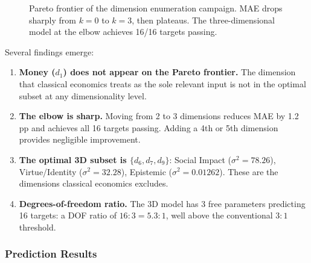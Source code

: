 \documentclass[manuscript,review,anonymous]{acmart}
\begin{document}
\begin{figure}[t]
\centering
{}
\caption{Pareto frontier of the dimension enumeration campaign. MAE drops sharply from $k=0$ to $k=3$, then plateaus. The three-dimensional model at the elbow achieves 16/16 targets passing.}
\label{fig:pareto}
\end{figure}

Several findings emerge:

\begin{enumerate}
    \item \textbf{Money ($d_1$) does not appear on the Pareto frontier.} The dimension that classical economics treats as the sole relevant input is not in the optimal subset at any dimensionality level.
    \item \textbf{The elbow is sharp.} Moving from 2 to 3 dimensions reduces MAE by 1.2 pp and achieves all 16 targets passing. Adding a 4th or 5th dimension provides negligible improvement.
    \item \textbf{The optimal 3D subset is $\{d_6, d_7, d_9\}$}: Social Impact ($\sigma^2 = 78.26$), Virtue/Identity ($\sigma^2 = 32.28$), Epistemic ($\sigma^2 = 0.01262$). These are the dimensions classical economics excludes.
    \item \textbf{Degrees-of-freedom ratio.} The 3D model has 3 free parameters predicting 16 targets: a DOF ratio of $16\!:\!3 = 5.3\!:\!1$, well above the conventional $3\!:\!1$ threshold.
\end{enumerate}

\subsubsection{Prediction Results}
\end{document}
